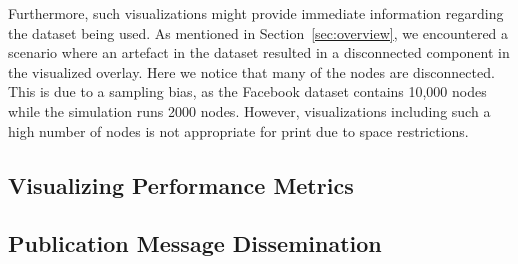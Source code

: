 Furthermore, such visualizations might provide immediate information
regarding the dataset being used. As mentioned in
Section~\ref{sec:overview}, we encountered a scenario where an artefact
in the dataset resulted in a disconnected component in the visualized
overlay. Here we notice that many of the nodes are disconnected. This is
due to a sampling bias, as the Facebook dataset contains 10,000 nodes
while the simulation runs 2000 nodes. However, visualizations including
such a high number of nodes is not appropriate for print due to space
restrictions.

\subsection{Visualizing Performance Metrics}

\subsection{Publication Message Dissemination}

